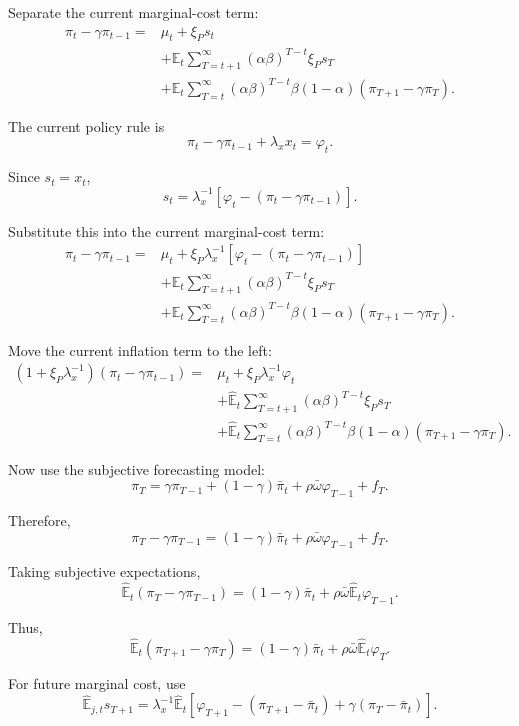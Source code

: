 \documentclass[12pt]{article}
\begin{document}
Separate the current marginal-cost term:
\[
\begin{aligned}
\pi_t-\gamma\pi_{t-1}
=
&\mu_t
+
\xi_P s_t \\
&+
\hat{\mathbb{E}}_{t}
\sum_{T=t+1}^{\infty}
(\alpha\beta)^{T-t}
\xi_P s_T \\
&+
\hat{\mathbb{E}}_{t}
\sum_{T=t}^{\infty}
(\alpha\beta)^{T-t}
\beta(1-\alpha)(\pi_{T+1}-\gamma\pi_T).
\end{aligned}
\]

The current policy rule is
\[
\pi_t-\gamma\pi_{t-1}+\lambda_x x_t=\varphi_t.
\]

Since $s_t=x_t$,
\[
s_t
=
\lambda_x^{-1}
\left[
\varphi_t-(\pi_t-\gamma\pi_{t-1})
\right].
\]

Substitute this into the current marginal-cost term:
\[
\begin{aligned}
\pi_t-\gamma\pi_{t-1}
=
&\mu_t
+
\xi_P\lambda_x^{-1}
\left[
\varphi_t-(\pi_t-\gamma\pi_{t-1})
\right] \\
&+
\hat{\mathbb{E}}_{t}
\sum_{T=t+1}^{\infty}
(\alpha\beta)^{T-t}
\xi_P s_T \\
&+
\hat{\mathbb{E}}_{t}
\sum_{T=t}^{\infty}
(\alpha\beta)^{T-t}
\beta(1-\alpha)(\pi_{T+1}-\gamma\pi_T).
\end{aligned}
\]

Move the current inflation term to the left:
\[
\begin{aligned}
(1+\xi_P\lambda_x^{-1})(\pi_t-\gamma\pi_{t-1})
=
&\mu_t
+
\xi_P\lambda_x^{-1}\varphi_t \\
&+
\hat{\mathbb{E}}_{t}
\sum_{T=t+1}^{\infty}
(\alpha\beta)^{T-t}
\xi_P s_T \\
&+
\hat{\mathbb{E}}_{t}
\sum_{T=t}^{\infty}
(\alpha\beta)^{T-t}
\beta(1-\alpha)(\pi_{T+1}-\gamma\pi_T).
\end{aligned}
\]

Now use the subjective forecasting model:
\[
\pi_T
=
\gamma\pi_{T-1}
+
(1-\gamma)\bar{\pi}_t
+
\rho\bar{\omega}\varphi_{T-1}
+
f_T.
\]

Therefore,
\[
\pi_T-\gamma\pi_{T-1}
=
(1-\gamma)\bar{\pi}_t
+
\rho\bar{\omega}\varphi_{T-1}
+
f_T.
\]

Taking subjective expectations,
\[
\hat{\mathbb{E}}_t(\pi_T-\gamma\pi_{T-1})
=
(1-\gamma)\bar{\pi}_t
+
\rho\bar{\omega}\hat{\mathbb{E}}_t\varphi_{T-1}.
\]

Thus,
\[
\hat{\mathbb{E}}_t(\pi_{T+1}-\gamma\pi_T)
=
(1-\gamma)\bar{\pi}_t
+
\rho\bar{\omega}\hat{\mathbb{E}}_t\varphi_T.
\]

For future marginal cost, use
\[
\hat{\mathbb{E}}_{j,t}s_{T+1}
=
\lambda_x^{-1}
\hat{\mathbb{E}}_t
\left[
\varphi_{T+1}
-
(\pi_{T+1}-\bar{\pi}_t)
+
\gamma(\pi_T-\bar{\pi}_t)
\right].
\]
\end{document}
